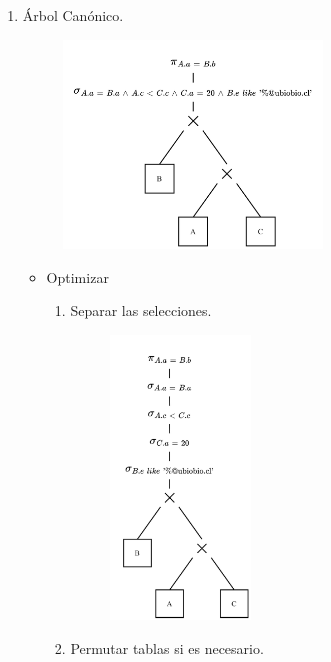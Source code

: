 \documentclass{templateNote}
\begin{document}
\begin{enumerate}
    \newpage
    \item \'Arbol Can\'onico.
    \begin{figure}[H]
        \centering
        \includegraphics[width=0.65\textwidth]{img/E3-Canonico.png}
    \end{figure}

    \begin{itemize}
        \item Optimizar
        \begin{enumerate}
            \item Separar las selecciones.
            \begin{figure}[H]
                \centering
                \includegraphics[width=0.4\textwidth]{img/E3-Paso-1.png}
            \end{figure}

            \newpage
            \item Permutar tablas si es necesario.


\end{enumerate}
\end{itemize}
\end{enumerate}
\end{document}
